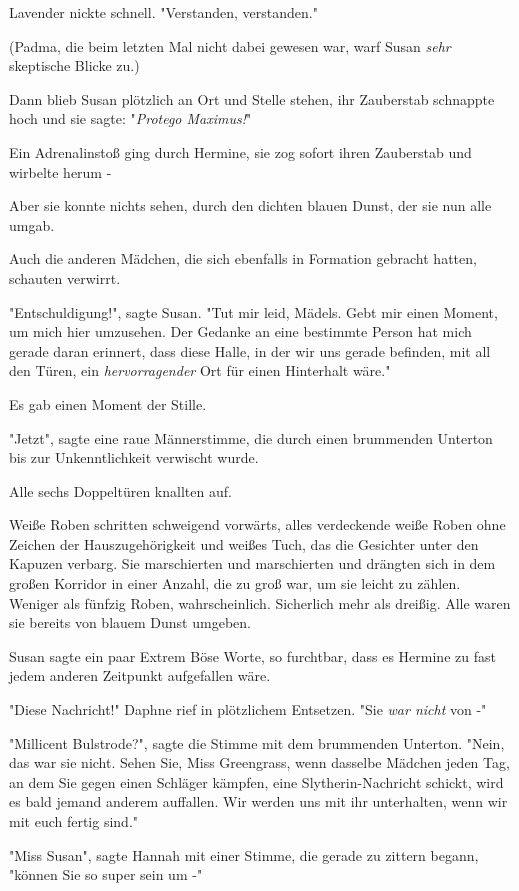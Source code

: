 {Lavender nickte schnell. "Verstanden, verstanden."

(Padma, die beim letzten Mal nicht dabei gewesen war, warf Susan \emph{sehr} skeptische Blicke zu.)

Dann blieb Susan plötzlich an Ort und Stelle stehen, ihr Zauberstab schnappte hoch und sie sagte: "\emph{Protego Maximus!}"

Ein Adrenalinstoß ging durch Hermine, sie zog sofort ihren Zauberstab und wirbelte herum -

Aber sie konnte nichts sehen, durch den dichten blauen Dunst, der sie nun alle umgab.

Auch die anderen Mädchen, die sich ebenfalls in Formation gebracht hatten, schauten verwirrt.

"Entschuldigung!", sagte Susan. "Tut mir leid, Mädels. Gebt mir einen Moment, um mich hier umzusehen. Der Gedanke an eine bestimmte Person hat mich gerade daran erinnert, dass diese Halle, in der wir uns gerade befinden, mit all den Türen, ein \emph{hervorragender} Ort für einen Hinterhalt wäre."

Es gab einen Moment der Stille.

"Jetzt", sagte eine raue Männerstimme, die durch einen brummenden Unterton bis zur Unkenntlichkeit verwischt wurde.

Alle sechs Doppeltüren knallten auf.

Weiße Roben schritten schweigend vorwärts, alles verdeckende weiße Roben ohne Zeichen der Hauszugehörigkeit und weißes Tuch, das die Gesichter unter den Kapuzen verbarg. Sie marschierten und marschierten und drängten sich in dem großen Korridor in einer Anzahl, die zu groß war, um sie leicht zu zählen. Weniger als fünfzig Roben, wahrscheinlich. Sicherlich mehr als dreißig. Alle waren sie bereits von blauem Dunst umgeben.

Susan sagte ein paar Extrem Böse Worte, so furchtbar, dass es Hermine zu fast jedem anderen Zeitpunkt aufgefallen wäre.

"Diese Nachricht!" Daphne rief in plötzlichem Entsetzen. "Sie \emph{war nicht} von -"

"Millicent Bulstrode?", sagte die Stimme mit dem brummenden Unterton. "Nein, das war sie nicht. Sehen Sie, Miss Greengrass, wenn dasselbe Mädchen jeden Tag, an dem Sie gegen einen Schläger kämpfen, eine Slytherin-Nachricht schickt, wird es bald jemand anderem auffallen. Wir werden uns mit ihr unterhalten, wenn wir mit euch fertig sind."

"Miss Susan", sagte Hannah mit einer Stimme, die gerade zu zittern begann, "können Sie so super sein um -"

}
